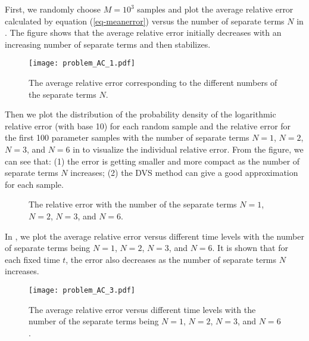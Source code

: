 \documentclass[10pt,a4paper]{article}
\numberwithin{equation}{section}
\numberwithin{lemma}{section}
\numberwithin{example}{section}
\numberwithin{definition}{section}
\numberwithin{assumption}{section}
\numberwithin{theorem}{section}
\numberwithin{proposition}{section}
\numberwithin{corollary}{section}
\numberwithin{remark}{section}
\begin{document}
    
First, we randomly choose $M=10^3$ samples and plot the average relative error calculated by equation (\ref{eq-meanerror}) versus the number of separate terms $N$ in . The figure shows that the average relative error initially decreases with an increasing number of separate terms and then stabilizes.
\begin{figure}[htbp]
    \centering
    \texttt{[image: problem\_AC\_1.pdf]}
    \caption{The average relative error corresponding to the different numbers of the separate terms $N$.}
    \label{fig_AC.1}
\end{figure}

Then we plot the distribution of the probability density of the logarithmic relative error (with base 10) for each random sample and the relative error for the first 100 parameter samples with the number of separate terms $N=1$, $N=2$, $N=3$, and $N=6$ in  to visualize the individual relative error. From the figure, we can see that: (1) the error is getting smaller and more compact as the number of separate terms $N$ increases; (2) the DVS method can give a good approximation for each sample.
\begin{figure}[htbp]
\centering
{}
\caption{The relative error with the number of the separate terms $N=1$, $N=2$, $N=3$, and $N=6$.}
\label{fig_AC.2}
\end{figure}
	

In , we plot the average relative error versus different time levels with the number of separate terms being $N=1$, $N=2$, $N=3$, and $N=6$. It is shown that for each fixed time $t$, the error also decreases as the number of separate terms $N$ increases.
\begin{figure}[htbp]
    \centering
    \texttt{[image: problem\_AC\_3.pdf]}
    \caption{The average relative error versus different time levels with the number of the separate terms being $N=1$, $N=2$, $N=3$, and $N=6$.}
    \label{fig_AC.3}
\end{figure}
\end{document}
